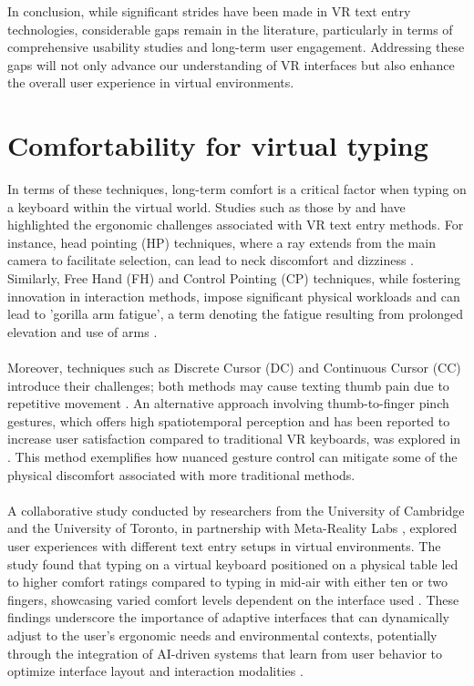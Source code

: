 In conclusion, while significant strides have been made in \ac{VR} text entry technologies, considerable gaps remain in the literature, particularly in terms of comprehensive usability studies and long-term user engagement. Addressing these gaps will not only advance our understanding of \ac{VR} interfaces but also enhance the overall user experience in virtual environments.

\section{Comfortability for virtual typing}
\label{sec:Comfortability for virtual typing} 

In terms of these techniques, long-term comfort is a critical factor when typing on a keyboard within the virtual world. Studies such as those by \cite{dube2019textentry} and \cite{kruger2018text} have highlighted the ergonomic challenges associated with \ac{VR} text entry methods. For instance, head pointing (HP) techniques, where a ray extends from the main camera to facilitate selection, can lead to neck discomfort and dizziness \cite{dudley2019keyboard}. Similarly, Free Hand (FH) and Control Pointing (CP) techniques, while fostering innovation in interaction methods, impose significant physical workloads and can lead to 'gorilla arm fatigue', a term denoting the fatigue resulting from prolonged elevation and use of arms \cite{pseudoHaptics2022}.\\ \\
Moreover, techniques such as Discrete Cursor (DC) and Continuous Cursor (CC) introduce their challenges; both methods may cause texting thumb pain due to repetitive movement \cite{giovannelli2022visual}. An alternative approach involving thumb-to-finger pinch gestures, which offers high spatiotemporal perception and has been reported to increase user satisfaction compared to traditional \ac{VR} keyboards, was explored in \cite{kruger2018text}. This method exemplifies how nuanced gesture control can mitigate some of the physical discomfort associated with more traditional methods.\\ \\
A collaborative study conducted by researchers from the University of Cambridge and the University of Toronto, in partnership with Meta-Reality Labs \cite{leng2022flower}, explored user experiences with different text entry setups in virtual environments. The study found that typing on a virtual keyboard positioned on a physical table led to higher comfort ratings compared to typing in mid-air with either ten or two fingers, showcasing varied comfort levels dependent on the interface used \cite{dudley2019keyboard}. These findings underscore the importance of adaptive interfaces that can dynamically adjust to the user's ergonomic needs and environmental contexts, potentially through the integration of AI-driven systems that learn from user behavior to optimize interface layout and interaction modalities \cite{xu2023haptic}.\\ \\
